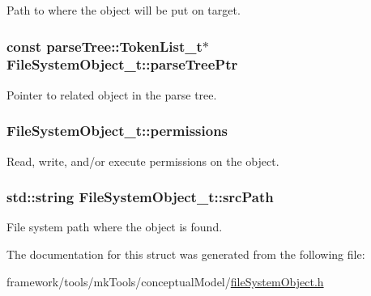 Path to where the object will be put on target. 

\subsubsection[{\texorpdfstring{parse\+Tree\+Ptr}{parseTreePtr}}]{\setlength{\rightskip}{0pt plus 5cm}const {\bf parse\+Tree\+::\+Token\+List\+\_\+t}$\ast$ File\+System\+Object\+\_\+t\+::parse\+Tree\+Ptr}\hypertarget{struct_file_system_object__t_a33c640c1671ba4b4616783c45870d56e}{}\label{struct_file_system_object__t_a33c640c1671ba4b4616783c45870d56e}


Pointer to related object in the parse tree. 

\subsubsection[{\texorpdfstring{permissions}{permissions}}]{ File\+System\+Object\+\_\+t\+::permissions}\hypertarget{struct_file_system_object__t_a04b6bf4dfc13dd1e46bf5b944eb1d795}{}\label{struct_file_system_object__t_a04b6bf4dfc13dd1e46bf5b944eb1d795}


Read, write, and/or execute permissions on the object. 

\subsubsection[{\texorpdfstring{src\+Path}{srcPath}}]{\setlength{\rightskip}{0pt plus 5cm}std\+::string File\+System\+Object\+\_\+t\+::src\+Path}\hypertarget{struct_file_system_object__t_a7624ce646d950f2320f570d5e2994404}{}\label{struct_file_system_object__t_a7624ce646d950f2320f570d5e2994404}


File system path where the object is found. 



The documentation for this struct was generated from the following file\+:\begin{DoxyCompactItemize}
\item 
framework/tools/mk\+Tools/conceptual\+Model/\hyperlink{file_system_object_8h}{file\+System\+Object.\+h}\end{DoxyCompactItemize}
